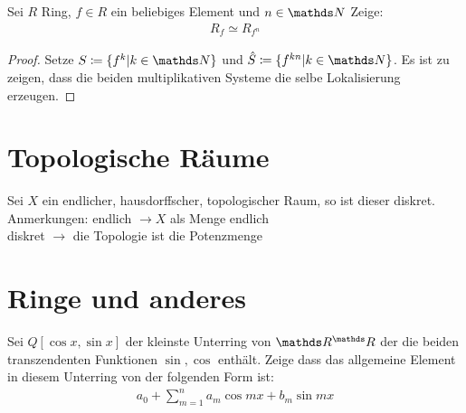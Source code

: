 \documentclass[ngerman, parskip=half, titlepage=false]{scrartcl}
\begin{document}
\begin{Lem}
  Sei $R$ Ring, $f \in R$ ein beliebiges Element und $n \in \N$ Zeige:\\
  \begin{gather*}
    \displaystyle R_f \simeq R_{f^n}
  \end{gather*}
  \begin{proof}
    Setze $S \coloneqq \{ f^k | k \in \N \}$ und $\hat{S} \coloneqq \{ f^{kn} 
    | k \in \N\}$. Es ist zu zeigen, dass die beiden multiplikativen Systeme
    die selbe Lokalisierung erzeugen.
  \end{proof}
\end{Lem}

\section{Topologische Räume}

\begin{Satz}
  Sei $X$ ein endlicher, hausdorffscher, topologischer Raum, so ist
  dieser diskret.
Anmerkungen: endlich $\rightarrow X$ als Menge endlich\\
diskret $\rightarrow$ die Topologie ist die Potenzmenge
\end{Satz}

\section{Ringe und anderes}

\begin{Lem}
  Sei $Q[\cos x , \sin x]$ der kleinste Unterring von $\R^\R$ der
  die beiden transzendenten Funktionen $\sin , \cos$ enthält. Zeige
  dass das allgemeine Element in diesem Unterring von der folgenden
  Form ist:
  \begin{gather*}
    a_0 + \sum\limits_{m=1}^n a_m \cos mx + b_m \sin mx
  \end{gather*}
\end{Lem}
\end{document}
